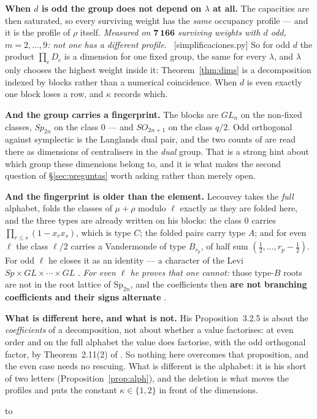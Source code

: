 \documentclass[11pt,a4paper]{article}
\theoremstyle{definition}
\newcommand{\Sp}{\mathrm{Sp}}
\newcommand{\ver}[1]{\unskip\penalty0\ \textcolor{azul}{\small\textsf{[#1]}}}
\newenvironment{keybox}
  {\par\vspace{9pt}\begin{lrbox}{\fichabox}%
   \begin{minipage}{0.90\textwidth}\vspace{7pt}\setlength{\parskip}{3pt}}
  {\vspace{7pt}\end{minipage}\end{lrbox}%
   \par\noindent\hbox to \textwidth{\hfill
   \textcolor{azul}{\rule[-\dp\fichabox]{3.2pt}{\dimexpr\ht\fichabox+\dp\fichabox\relax}}%
   \colorbox{fondoficha}{\usebox{\fichabox}}\hfill}%
   \par\vspace{9pt}}
\begin{document}
\begin{keybox}
\textbf{When $d$ is odd the group does not depend on $\lambda$ at all.} The capacities are then
saturated, so every surviving weight has the \emph{same} occupancy profile --- and it is the profile
of $\rho$ itself. \emph{Measured on $\mathbf{7\,166}$ surviving weights with $d$ odd,
$m=2,\dots,9$: not one has a different profile.} \ver{simplificaciones.py} So for odd $d$ the
product $\prod_c D_c$ is a dimension for one fixed group, the same for every $\lambda$, and
$\lambda$ only chooses the highest weight inside it: Theorem~\ref{thm:dims} is a decomposition
indexed by blocks rather than a numerical coincidence. When $d$ is even exactly one block loses a
row, and $\kappa$ records which.

\smallskip
\textbf{And the group carries a fingerprint.} The blocks are $GL_{n}$ on the non-fixed classes,
$Sp_{2n}$ on the class $0$ --- and $SO_{2n+1}$ on the class $q/2$. Odd orthogonal against symplectic
is the Langlands dual pair, and the two counts of \cite{NPP25} are read there as dimensions of
centralisers in the \emph{dual} group. That is a strong hint about which group these dimensions
belong to, and it is what makes the second question of \S\ref{sec:preguntas} worth asking rather than
merely open.

\smallskip
\textbf{And the fingerprint is older than the element.} Lecouvey \cite[\S3.2.2]{Lec07a} takes the
\emph{full} alphabet, folds the classes of $\mu+\rho$ modulo $\ell$ exactly as they are folded here,
and the three types are already written on his blocks: the class $0$ carries
$\prod_{r\le s}(1-x_rx_s)$, which is type $C$; the folded pairs carry type $A$; and for even $\ell$
the class $\ell/2$ carries a Vandermonde of type $B_{r_p}$, of half sum
$(\tfrac12,\dots,r_p-\tfrac12)$. For odd $\ell$ he closes it as an identity --- a character of the
Levi $Sp\times GL\times\cdots\times GL$ \cite[Thm.~3.2.3]{Lec07a}. \emph{For even $\ell$ he proves
that one cannot:} those type-$B$ roots are not in the root lattice of $\Sp_{2n}$, and the
coefficients then \textbf{are not branching coefficients and their signs alternate}
\cite[Prop.~3.2.5]{Lec07a}.

\smallskip
\textbf{What is different here, and what is not.} His Proposition~3.2.5 is about the
\emph{coefficients} of a decomposition, not about whether a value factorises: at even order and on
the full alphabet the value does factorise, with the odd orthogonal factor, by Theorem~2.11(2) of
\cite{AK22}. So nothing here overcomes that proposition, and the even case needs no rescuing. What
is different is the alphabet: it is his short of two letters (Proposition~\ref{prop:alph}), and the
deletion is what moves the profiles and puts the constant $\kappa\in\{1,2\}$ in front of the
dimensions.
\end{keybox}
\end{document}
